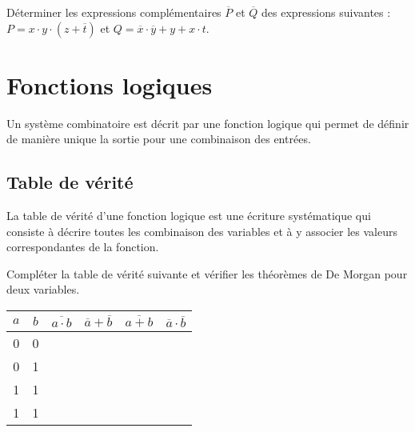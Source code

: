 \begin{exemple}
Déterminer les expressions complémentaires $\overline{P}$ et $\overline{Q}$ des expressions suivantes : 
$P = x\cdot y \cdot (z + \overline{t})$ et $Q=\overline{x}\cdot\overline{y} + y + x\cdot t$.
\end{exemple}

\section{Fonctions logiques}

Un système combinatoire est décrit par une fonction logique qui permet de définir de manière unique la sortie pour une combinaison des entrées. 

\subsection{Table de vérité}
La table de vérité d'une fonction logique est une écriture systématique qui consiste à décrire toutes les combinaison des variables et à y associer les valeurs correspondantes de la fonction. 

\begin{exemple}


Compléter la table de vérité suivante et vérifier les théorèmes de De Morgan pour deux variables.
\begin{center}
\begin{tabular}[c]{|c|c||c|c|c|c|}
\hline
$a$ & $b$ & $\overline{a\cdot b}$ & $\overline{a} + \overline{b}$ & $\overline{a+b}$ & $\overline{a}\cdot\overline{b}$ \\
\hline \hline 
0 & 0 & & & & \\ \hline
0 & 1 & & & & \\ \hline
1 & 1 & & & & \\ \hline
1 & 1 & & & & \\ \hline
\end{tabular}
\end{center}

\end{exemple}

